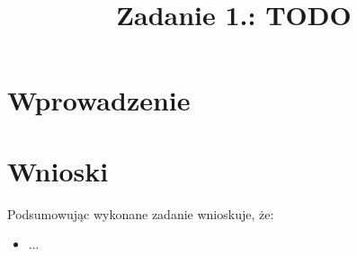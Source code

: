 \documentclass{classrep}
\author{%
    \studentinfo[216806@edu.p.lodz.pl]{Kamil Kowalewski TODO}{216806}
}
\title{Zadanie 1.: TODO}
\begin{document}
    \maketitle
    \thispagestyle{fancyplain}

    \section{Wprowadzenie} {

    }

    \section{} {

    }

    \section{Wnioski} {
        Podsumowując wykonane zadanie wnioskuje, że:
        \begin{itemize}
            \item ...

        \end{itemize}
    }

    \begin{thebibliography}{0}
    \end{thebibliography}
\end{document}
